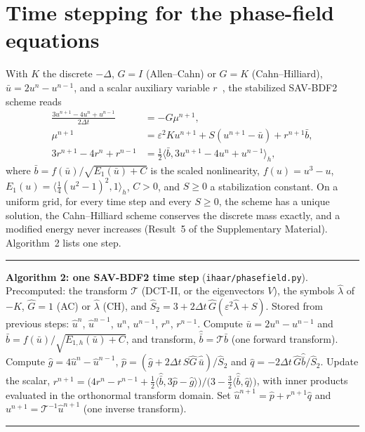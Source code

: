 \section{Time stepping for the phase-field equations}\label{app:sav}
With $K$ the discrete $-\Delta$, $G=I$ (Allen--Cahn) or $G=K$ (Cahn--Hilliard), $\bar u=2u^n-u^{n-1}$, and a
scalar auxiliary variable $r$~\cite{shen2018scalar}, the stabilized SAV-BDF2 scheme reads
\begin{align}
\frac{3u^{n+1}-4u^n+u^{n-1}}{2\Delta t}&=-G\mu^{n+1},\label{eq:sav1}\\
\mu^{n+1}&=\varepsilon^2Ku^{n+1}+S(u^{n+1}-\bar u)+r^{n+1}\bar b,\label{eq:sav1b}\\
3r^{n+1}-4r^n+r^{n-1}&=\tfrac12\langle\bar b,3u^{n+1}-4u^n+u^{n-1}\rangle_h,\label{eq:sav2}
\end{align}
where $\bar b=f(\bar u)/\sqrt{E_1(\bar u)+C}$ is the scaled nonlinearity, $f(u)=u^3-u$,
$E_1(u)=\langle\frac14(u^2-1)^2,1\rangle_h$, $C>0$, and $S\ge0$ a stabilization constant. On a uniform
grid, for every time step and every $S\ge0$, the scheme has a unique solution, the Cahn--Hilliard scheme
conserves the discrete mass exactly, and a modified energy never increases (Result~5 of the Supplementary
Material). Algorithm~2 lists one step.

\begin{algorithm}[t]\small\hrule\smallskip
\noindent\textbf{Algorithm 2: one SAV-BDF2 time step} (\texttt{ihaar/phasefield.py}).
Precomputed: the transform $\mathcal T$ (DCT-II, or the eigenvectors $V$), the symbols $\hat\lambda$ of
$-K$, $\hat G=1$ (AC) or $\hat\lambda$ (CH), and $\hat S_2=3+2\Delta t\,\hat G(\varepsilon^2\hat\lambda+S)$.
Stored from previous steps: $\hat u^n$, $\hat u^{n-1}$, $u^n$, $u^{n-1}$, $r^n$, $r^{n-1}$.
 Compute $\bar u=2u^n-u^{n-1}$ and $\bar b=f(\bar u)/\sqrt{E_{1,h}(\bar u)+C}$, and transform, $\hat{\bar b}=\mathcal T\bar b$ (one forward transform).
 Compute $\hat g=4\hat u^n-\hat u^{n-1}$, $\hat p=(\hat g+2\Delta t\,S\hat G\,\hat{\bar u})/\hat S_2$ and $\hat q=-2\Delta t\,\hat G\hat{\bar b}/\hat S_2$.
 Update the scalar, $r^{n+1}=\big(4r^n-r^{n-1}+\tfrac12\langle\hat{\bar b},3\hat p-\hat g\rangle\big)/\big(3-\tfrac32\langle\hat{\bar b},\hat q\rangle\big)$, with inner products evaluated in the orthonormal transform domain.
 Set $\hat u^{n+1}=\hat p+r^{n+1}\hat q$ and $u^{n+1}=\mathcal T^{-1}\hat u^{n+1}$ (one inverse transform).
\smallskip\hrule
\end{algorithm}

